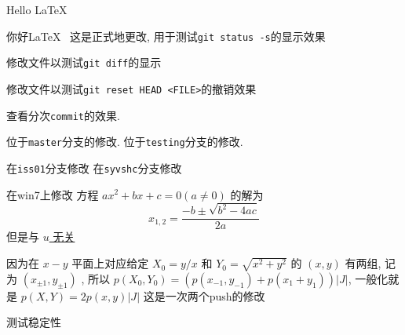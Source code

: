 \documentclass{ctexart}
\begin{document}
	Hello \LaTeX~

	你好\LaTeX~ %
	这是正式地更改, 用于测试\verb|git status -s|的显示效果

	修改文件以测试\verb|git diff|的显示

	修改文件以测试\verb|git reset HEAD <FILE>|的撤销效果

	查看分次\verb|commit|的效果. 

	位于\verb|master|分支的修改. 
	位于\verb|testing|分支的修改. 
	
	在\verb|iss01|分支修改
	在\verb|syvshc|分支修改

	在win7上修改
	方程 $ ax^{2}+bx+c=0(a\ne 0) $ 的解为
	\[
		x_{1, 2}=\frac{-b\pm\sqrt{b^{2}-4ac}}{2a}
	\]
	但是与 \uline{$ u $ 无关}

	因为在 $ x-y $ 平面上对应给定 $ X_{0}=y/x $ 和 $ Y_{0}=\sqrt{x^{2}+y^{2}} $ 的 $ (x, y) $ 有两组, 记为 $ (x_{\pm1}, y_{\pm1}) $ , 所以 $ p(X_{0}, Y_{0})=(p(x_{-1}, y_{-1})+p(x_{1}+y_{1}))|J| $, 一般化就是 $ p(X, Y)=2p(x, y)|J| $
	这是一次两个push的修改

	测试稳定性
\end{document}
